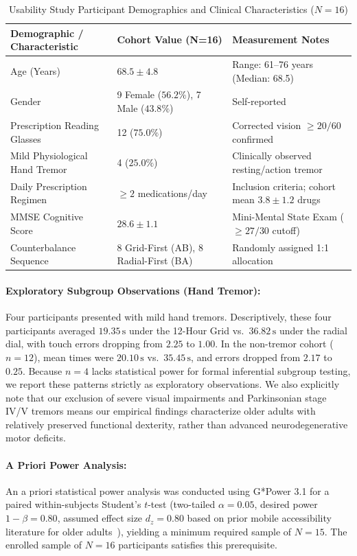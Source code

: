 \documentclass[11pt,a4paper]{article}
\begin{document}
\begin{table}[htbp]
\centering
\small
\caption{Usability Study Participant Demographics and Clinical Characteristics ($N=16$)}
\label{tab:demographics}
\begin{tabularx}{\linewidth}{lXX}
\toprule
\textbf{Demographic / Characteristic} & \textbf{Cohort Value (N=16)} & \textbf{Measurement Notes} \\
\midrule
Age (Years) & $68.5 \pm 4.8$ & Range: 61--76 years (Median: 68.5) \\
Gender & 9 Female ($56.2\%$), 7 Male ($43.8\%$) & Self-reported \\
Prescription Reading Glasses & 12 ($75.0\%$) & Corrected vision $\ge 20/60$ confirmed \\
Mild Physiological Hand Tremor & 4 ($25.0\%$) & Clinically observed resting/action tremor \\
Daily Prescription Regimen & $\ge 2$ medications/day & Inclusion criteria; cohort mean $3.8 \pm 1.2$ drugs \\
MMSE Cognitive Score & $28.6 \pm 1.1$ & Mini-Mental State Exam ($\ge 27/30$ cutoff) \\
Counterbalance Sequence & 8 Grid-First (AB), 8 Radial-First (BA) & Randomly assigned 1:1 allocation \\
\bottomrule
\end{tabularx}
\end{table}

\paragraph{Exploratory Subgroup Observations (Hand Tremor):} Four participants presented with mild hand tremors. Descriptively, these four participants averaged $19.35\,\text{s}$ under the 12-Hour Grid vs.\ $36.82\,\text{s}$ under the radial dial, with touch errors dropping from $2.25$ to $1.00$. In the non-tremor cohort ($n=12$), mean times were $20.10\,\text{s}$ vs.\ $35.45\,\text{s}$, and errors dropped from $2.17$ to $0.25$. Because $n=4$ lacks statistical power for formal inferential subgroup testing, we report these patterns strictly as exploratory observations. We also explicitly note that our exclusion of severe visual impairments and Parkinsonian stage IV/V tremors means our empirical findings characterize older adults with relatively preserved functional dexterity, rather than advanced neurodegenerative motor deficits.

\paragraph{A Priori Power Analysis:} An a priori statistical power analysis was conducted using G*Power 3.1 for a paired within-subjects Student's $t$-test (two-tailed $\alpha = 0.05$, desired power $1 - \beta = 0.80$, assumed effect size $d_z = 0.80$ based on prior mobile accessibility literature for older adults~\cite{trewin2013physical,siek2006fat}), yielding a minimum required sample of $N = 15$. The enrolled sample of $N = 16$ participants satisfies this prerequisite.
\end{document}
